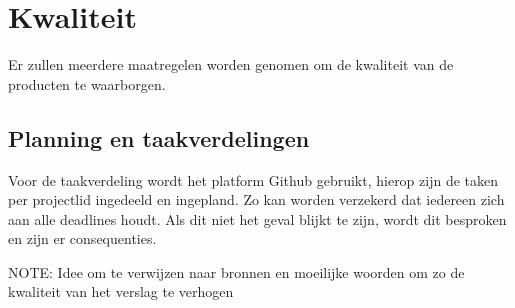 \section{Kwaliteit}
Er zullen meerdere maatregelen worden genomen om de kwaliteit van de producten te waarborgen. 


\subsection{Planning en taakverdelingen}
Voor de taakverdeling wordt het platform Github gebruikt, hierop zijn de taken per projectlid ingedeeld en ingepland. Zo kan worden verzekerd dat iedereen zich aan alle deadlines houdt. Als dit niet het geval blijkt te zijn, wordt dit besproken en zijn er consequenties.






NOTE: Idee om te verwijzen naar bronnen en moeilijke woorden om zo de kwaliteit van het verslag te verhogen